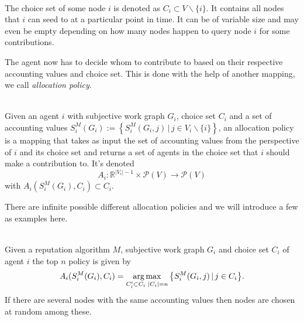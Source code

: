 \begin{definition}\ \\
\label{def:Choice Set}
\noindent{}The choice set of some node $i$ is denoted as $C_i\subset{}V\backslash\lbrace{}i\rbrace$. It contains all nodes that $i$ can seed to at a particular point in time. It can be of variable size and may even be empty depending on how many nodes happen to query node $i$ for some contributions.\vspace{1em}\\
\end{definition}

\noindent{}The agent now has to decide whom to contribute to based on their respective accounting values and choice set. This is done with the help of another mapping, we call {\it allocation policy}. \vspace{1em}\\

\begin{definition}\ \\
\label{def:Allocation Policy}
\noindent{}Given an agent $i$ with subjective work graph $G_i$, choice set $C_i$ and a set of accounting values $S^M_i(G_i):=\left\lbrace{}S^M_i(G_i,j)\,|\,j\in{}V_i\backslash\lbrace{}i\rbrace\right\rbrace$, an allocation policy is a mapping that takes as input the set of accounting values from the perspective of $i$ and its choice set and returns a set of agents in the choice set that $i$ should make a contribution to. It's denoted
\[
A_i:\mathbb{R}^{|V_i|-1}\times{}\mathcal{P}(V)\rightarrow\mathcal{P}(V)
\]
\noindent{}with $A_i(S^M_i(G_i),C_i)\subset{}C_i.$\vspace{1em}\\
\end{definition}

\noindent{}There are infinite possible different allocation policies and we will introduce a few as examples here. \vspace{1em}\\

\begin{example}\ \\
\label{ex:Top n Policy}
Given a reputation algorithm $M$, subjective work graph $G_i$ and choice set $C_i$ of agent $i$ the top $n$ policy is given by 
\[
A_i(S^M_i(G_i),C_i)=\operatorname*{arg\,max}\limits_{C'_i\subset{}C_i \,\, |C_i|=n}{\left\lbrace{}S^M_i(G_i,j)\,|\,j\in{}C_i\right\rbrace}.
\]
\noindent{}If there are several nodes with the same accounting values then nodes are chosen at random among these.\vspace{1em}\\
\end{example}

